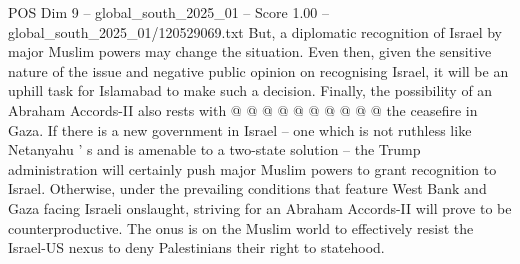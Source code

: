 \begin{textsample}{POS Dim 9 – global\_south\_2025\_01 – Score 1.00 – global\_south\_2025\_01/120529069.txt}
But, a diplomatic recognition of Israel by major Muslim powers may change the situation.
Even then, given the sensitive nature of the issue and negative public opinion on recognising Israel, it will be an uphill task for Islamabad to make such a decision.
Finally, the possibility of an Abraham Accords-II also rests with @ @ @ @ @ @ @ @ @ @ the ceasefire in Gaza.
If there is a new government in Israel -- one which is not ruthless like Netanyahu ' s and is amenable to a two-state solution -- the Trump administration will certainly push major Muslim powers to grant recognition to Israel.
Otherwise, under the prevailing conditions that feature West Bank and Gaza facing Israeli onslaught, striving for an Abraham Accords-II will prove to be counterproductive.
The onus is on the Muslim world to effectively resist the Israel-US nexus to deny Palestinians their right to statehood.

\end{textsample}
